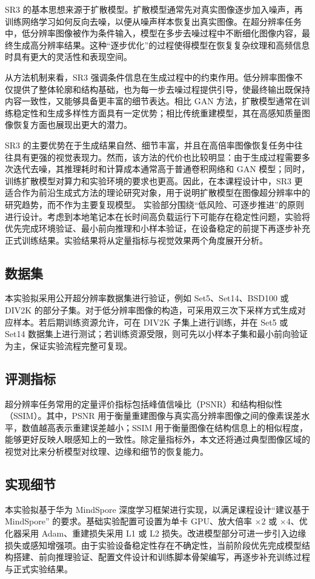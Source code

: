 \documentclass[bwprint]{report}
\begin{document}
SR3 的基本思想来源于扩散模型。扩散模型通常先对真实图像逐步加入噪声，再训练网络学习如何反向去噪，以便从噪声样本恢复出真实图像。在超分辨率任务中，低分辨率图像被作为条件输入，模型在多步去噪过程中不断细化图像内容，最终生成高分辨率结果。这种“逐步优化”的过程使得模型在恢复复杂纹理和高频信息时具有更大的灵活性和表现空间。

从方法机制来看，SR3 强调条件信息在生成过程中的约束作用。低分辨率图像不仅提供了整体轮廓和结构基础，也为每一步去噪过程提供引导，使最终输出既保持内容一致性，又能够具备更丰富的细节表达。相比 GAN 方法，扩散模型通常在训练稳定性和生成多样性方面具有一定优势；相比传统重建模型，其在高感知质量图像恢复方面也展现出更大的潜力。

SR3 的主要优势在于生成结果自然、细节丰富，并且在高倍率图像恢复任务中往往具有更强的视觉表现力。然而，该方法的代价也比较明显：由于生成过程需要多次迭代去噪，其推理耗时和计算成本通常高于普通卷积网络和 GAN 模型；同时，训练扩散模型对算力和实验环境的要求也更高。因此，在本课程设计中，SR3 更适合作为前沿生成式方法的理论研究对象，用于说明扩散模型在图像超分辨率中的研究趋势，而不作为主要复现模型。
实验部分围绕“低风险、可逐步推进”的原则进行设计。考虑到本地笔记本在长时间高负载运行下可能存在稳定性问题，实验将优先完成环境验证、最小前向推理和小样本验证，在设备稳定的前提下再逐步补充正式训练结果。实验结果将从定量指标与视觉效果两个角度展开分析。

\subsection{数据集}
本实验拟采用公开超分辨率数据集进行验证，例如 Set5、Set14、BSD100 或 DIV2K 的部分子集。对于低分辨率图像的构造，可采用双三次下采样方式生成对应样本。若后期训练资源允许，可在 DIV2K 子集上进行训练，并在 Set5 或 Set14 数据集上进行测试；若训练资源受限，则可先以小样本子集和最小前向验证为主，保证实验流程完整可复现。

\subsection{评测指标}
超分辨率任务常用的定量评价指标包括峰值信噪比（PSNR）和结构相似性（SSIM）。其中，PSNR 用于衡量重建图像与真实高分辨率图像之间的像素误差水平，数值越高表示重建误差越小；SSIM 用于衡量图像在结构信息上的相似程度，能够更好反映人眼感知上的一致性。除定量指标外，本文还将通过典型图像区域的视觉对比来分析模型对纹理、边缘和细节的恢复能力。

\subsection{实现细节}
本实验拟基于华为 MindSpore 深度学习框架进行实现，以满足课程设计“建议基于 MindSpore” 的要求。基础实验配置可设置为单卡 GPU、放大倍率 $\times 2$ 或 $\times 4$、优化器采用 Adam、重建损失采用 L1 或 L2 损失。改进模型部分可进一步引入边缘损失或感知增强项。由于实验设备稳定性存在不确定性，当前阶段优先完成模型结构搭建、前向推理验证、配置文件设计和训练脚本骨架编写，再逐步补充训练过程与正式实验结果。
\end{document}
